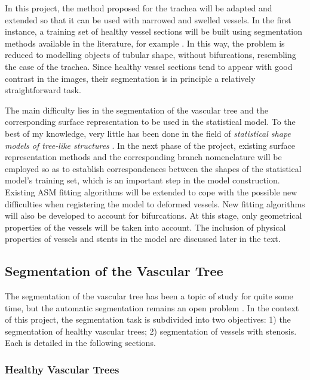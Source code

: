 In this project, the method proposed for the trachea will be adapted and extended so that it can be used with narrowed and swelled vessels. In the first instance, a training set of healthy vessel sections will be built using segmentation methods available in the literature, for example \citep{Florez2}. In this way, the problem is reduced to modelling objects of tubular shape, without bifurcations, resembling the case of the trachea. Since healthy vessel sections tend to appear with good contrast in the images, their segmentation is in principle a relatively straightforward task. 

The main difficulty lies in the segmentation of the vascular tree and the corresponding surface representation to be used in the statistical model. To the best of my knowledge, very little has been done in the field of {\em statistical shape models of tree-like structures} \citep{Feragen}. In the next phase of the project, existing surface representation methods \citep{Florez, Antiga} and the corresponding branch nomenclature will be employed so as to establish correspondences between the shapes of the statistical model's training set, which is an important step in the model construction. Existing ASM fitting algorithms will be extended to cope with the possible new difficulties when registering the model to deformed vessels. New fitting algorithms will also be developed to account for bifurcations. At this stage, only geometrical properties of the vessels will be taken into account. The inclusion of physical properties of vessels and stents in the model are discussed later in the text. 

\subsection{Segmentation of the Vascular Tree}

The segmentation of the vascular tree has been a topic of study for quite some time, but the automatic segmentation remains an open problem \citep{ORKI-08}. In the context of this project, the segmentation task is subdivided into two objectives: 1) the segmentation of healthy vascular trees; 2) segmentation of vessels with stenosis. Each is detailed in the following sections.

\subsubsection{Healthy Vascular Trees}

\challenge

